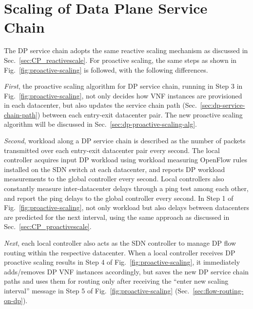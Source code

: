 \vspace{-3mm}
\section{Scaling of Data Plane Service Chain}
\label{sec-dp-scaling}

The DP service chain adopts the same reactive scaling mechanism as discussed in Sec.~\ref{sec:CP_reactivescale}. For proactive scaling, the same steps %
as shown in Fig.~\ref{fig:proactive-scaling} is followed, with the following differences.

{\em First}, the proactive scaling algorithm for DP service chain, running in Step 3 in Fig.~\ref{fig:proactive-scaling}, not only decides how VNF instances are provisioned in each datacenter, but also updates the service chain path (Sec.~\ref{sec:dp-service-chain-path}) between each entry-exit datacenter pair. The new proactive scaling algorithm will be discussed in Sec.~\ref{sec:dp-proactive-scaling-alg}.

{\em Second}, workload along a DP service chain is described as the number of packets transmitted over each entry-exit datacenter pair every second. The local controller acquires input DP workload using workload measuring OpenFlow rules installed on the SDN switch at each datacenter, and reports DP workload measurements to the global controller every second. Local controllers also constantly measure inter-datacenter delays through a ping test among each other, and report the ping delays to the global controller every second. In Step 1 of Fig.~\ref{fig:proactive-scaling}, not only workload but also delays between datacenters are predicted for the next interval, using the same approach as discussed in Sec.~\ref{sec:CP_proactivescale}.

{\em Next}, each local controller also acts as the SDN controller to manage DP flow routing within the respective datacenter. When a local controller receives DP proactive scaling results in Step 4 of Fig.~\ref{fig:proactive-scaling}, it immediately adds/removes DP VNF instances accordingly, but saves the new DP service chain paths and uses them for routing only after receiving the ``enter new scaling interval'' message in Step 5 of Fig.~\ref{fig:proactive-scaling} (Sec.~\ref{sec:flow-routing-on-dp}).



